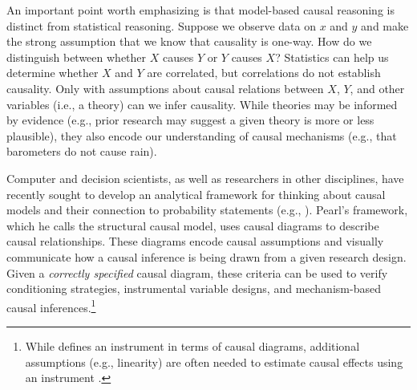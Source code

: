 \documentclass[12pt,reqno,titlepage]{amsart}
\theoremstyle{definition}
\begin{document}
\begin{doublespace}
An important point worth emphasizing is that model-based causal reasoning is distinct from statistical reasoning. 
Suppose we observe data on $x$ and $y$ and make the strong assumption that we know that causality is one-way. 
How do we distinguish between whether $X$ causes $Y$ or $Y$ causes $X$? 
Statistics can help us determine whether $X$ and $Y$ are correlated, but correlations do not establish causality.
Only with assumptions about causal relations between $X$, $Y$, and other variables (i.e., a theory) can we infer causality.
While theories may be informed by evidence (e.g., prior research may suggest a given theory is more or less plausible), they also encode our understanding of causal mechanisms (e.g., that barometers do not cause rain).

Computer and decision scientists, as well as researchers in other disciplines, have recently sought to develop an analytical framework for thinking about causal models and their connection to probability statements (e.g., \citet{ Pearl:2009kh}).
Pearl's framework, which he calls the structural causal model, uses causal diagrams to describe causal relationships. 
These diagrams encode causal assumptions and visually communicate how a causal inference is being drawn from a given research design.
Given a \emph{correctly specified} causal diagram, these criteria can be used to verify conditioning strategies, instrumental variable designs, and mechanism-based causal inferences.\footnote{While \citet[p.248]{Pearl:2009kh} defines an instrument in terms of causal diagrams, additional assumptions (e.g., linearity) are often needed to estimate causal effects using an instrument \citep{Angrist:1996p7456}.}


\end{doublespace}
\end{document}
